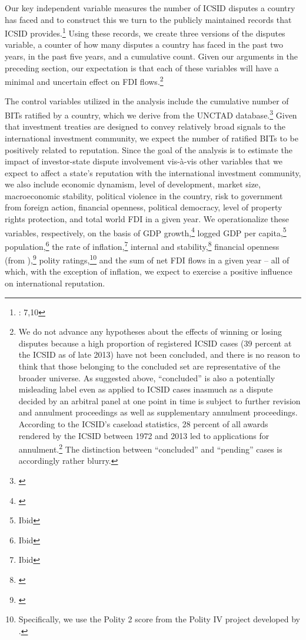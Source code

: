 \documentclass[12pt,onesided]{amsart}
\begin{document}
Our key independent variable measures the number of ICSID disputes a country has faced and to construct this we turn to the publicly maintained records that ICSID provides.\footnote{\citet{icsid:2015}: 7,10} Using these records, we create three versions of the disputes variable, a counter of how many disputes a country has faced in the past two years, in the past five years, and a cumulative count. Given our arguments in the preceding section, our expectation is that each of these variables will have a minimal and uncertain effect on FDI flows.\footnote{We do not advance any hypotheses about the effects of winning or losing disputes because a high proportion of registered ICSID cases (39 percent at the ICSID as of late 2013) have not been concluded, and there is no reason to think that those belonging to the concluded set are representative of the broader universe. As suggested above, ``concluded'' is also a potentially misleading label even as applied to ICSID cases inasmuch as a dispute decided by an arbitral panel at one point in time is subject to further revision and annulment proceedings as well as supplementary annulment proceedings. According to the ICSID's caseload statistics, 28 percent of all awards rendered by the ICSID between 1972 and 2013 led to applications for annulment.\footnote{\citet{icsid:2014}: 17} The distinction between ``concluded'' and ``pending'' cases is accordingly rather blurry.}

The control variables utilized in the analysis include the cumulative number of BITs ratified by a country, which we derive from the UNCTAD database.\footnote{\citet{unctad:2013c}} Given that investment treaties are designed to convey relatively broad signals to the international investment community, we expect the number of ratified BITs to be positively related to reputation. Since the goal of the analysis is to estimate the impact of investor-state dispute involvement vis-\`{a}-vis other variables that we expect to affect a state's reputation with the international investment community, we also include economic dynamism, level of development, market size, macroeconomic stability, political violence in the country, risk to government from foreign action, financial openness, political democracy, level of property rights protection, and total world FDI in a given year. We operationalize these variables, respectively, on the basis of GDP growth,\footnote{\citet{worldbank:2013}} logged GDP per capita,\footnote{Ibid} population,\footnote{Ibid} the rate of inflation,\footnote{Ibid} internal and stability,\footnote{\citet{prs:2013}} financial openness (from \citeauthor{chinn:ito:2008}),\footnote{\citet{chinn:ito:2008}} polity ratings,\footnote{Specifically, we use the Polity 2 score from the Polity IV project developed by \citet{marshall2013polity}.} and the sum of net FDI flows in a given year -- all of which, with the exception of inflation, we expect to exercise a positive influence on international reputation.
\end{document}
